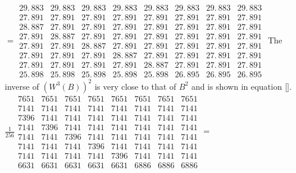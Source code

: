 \documentclass{article}
\begin{document}
$\allowbreak =\allowbreak 
\begin{array}{cccccccc}
29.\,\allowbreak 883 & 29.\,\allowbreak 883 & 29.\,\allowbreak 883 & 
29.\,\allowbreak 883 & 29.\,\allowbreak 883 & 29.\,\allowbreak 883 & 
29.\,\allowbreak 883 & 29.\,\allowbreak 883 \\ 
27.\,\allowbreak 891 & 27.\,\allowbreak 891 & 27.\,\allowbreak 891 & 
27.\,\allowbreak 891 & 27.\,\allowbreak 891 & 27.\,\allowbreak 891 & 
27.\,\allowbreak 891 & 27.\,\allowbreak 891 \\ 
28.\,\allowbreak 887 & 27.\,\allowbreak 891 & 27.\,\allowbreak 891 & 
27.\,\allowbreak 891 & 27.\,\allowbreak 891 & 27.\,\allowbreak 891 & 
27.\,\allowbreak 891 & 27.\,\allowbreak 891 \\ 
27.\,\allowbreak 891 & 28.\,\allowbreak 887 & 27.\,\allowbreak 891 & 
27.\,\allowbreak 891 & 27.\,\allowbreak 891 & 27.\,\allowbreak 891 & 
27.\,\allowbreak 891 & 27.\,\allowbreak 891 \\ 
27.\,\allowbreak 891 & 27.\,\allowbreak 891 & 28.\,\allowbreak 887 & 
27.\,\allowbreak 891 & 27.\,\allowbreak 891 & 27.\,\allowbreak 891 & 
27.\,\allowbreak 891 & 27.\,\allowbreak 891 \\ 
27.\,\allowbreak 891 & 27.\,\allowbreak 891 & 27.\,\allowbreak 891 & 
28.\,\allowbreak 887 & 27.\,\allowbreak 891 & 27.\,\allowbreak 891 & 
27.\,\allowbreak 891 & 27.\,\allowbreak 891 \\ 
27.\,\allowbreak 891 & 27.\,\allowbreak 891 & 27.\,\allowbreak 891 & 
27.\,\allowbreak 891 & 28.\,\allowbreak 887 & 27.\,\allowbreak 891 & 
27.\,\allowbreak 891 & 27.\,\allowbreak 891 \\ 
25.\,\allowbreak 898 & 25.\,\allowbreak 898 & 25.\,\allowbreak 898 & 
25.\,\allowbreak 898 & 25.\,\allowbreak 898 & 26.\,\allowbreak 895 & 
26.\,\allowbreak 895 & 26.\,\allowbreak 895
\end{array}
\allowbreak $ \newline
\newline
The inverse of $(W^3(B))^2$ is very close to that of $B^2$ and is shown in equation \ref{}.
\newline
$\frac{1}{256} 
\begin{array}{cccccccc}
7651 & 7651 & 7651 & 7651 & 7651 & 7651 & 7651 & 7651 \\ 
7141 & 7141 & 7141 & 7141 & 7141 & 7141 & 7141 & 7141 \\ 
7396 & 7141 & 7141 & 7141 & 7141 & 7141 & 7141 & 7141 \\ 
7141 & 7396 & 7141 & 7141 & 7141 & 7141 & 7141 & 7141 \\ 
7141 & 7141 & 7396 & 7141 & 7141 & 7141 & 7141 & 7141 \\ 
7141 & 7141 & 7141 & 7396 & 7141 & 7141 & 7141 & 7141 \\ 
7141 & 7141 & 7141 & 7141 & 7396 & 7141 & 7141 & 7141 \\ 
6631 & 6631 & 6631 & 6631 & 6631 & 6886 & 6886 & 6886
\end{array}
=$
\end{document}
